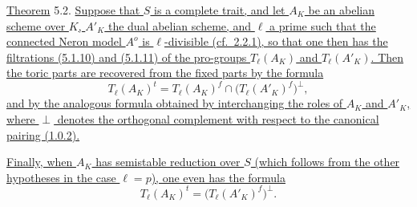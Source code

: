 %

\medskip
\noindent
\underline{Theorem} 5.2. \underline{Suppose that $S$ is a complete
trait, and let $A_K$ be an abelian scheme over $K$, $A'_K$ the dual
abelian scheme, and $\ell$ a prime such that the connected Neron model
$A^o$ is $\ell$-divisible (cf.\ 2.2.1), so that one then has the
filtrations (5.1.10) and (5.1.11) of the pro-groups
$T_\ell(A_K)$ and $T_\ell(A'_K)$.  Then the toric parts are
recovered from the fixed parts by the formula}
\begin{equation}\tag{5.2.1}
 T_\ell(A_K)^t
 =
 T_\ell(A_K)^f\cap\bigl(T_\ell(A'_K)^f\bigr)^\perp,
\end{equation}
\underline{and by the analogous formula obtained by interchanging the
roles of $A_K$ and $A'_K$, where $\perp$ denotes the orthogonal
complement with respect to the canonical pairing (1.0.2).}

\underline{Finally, when $A_K$ has semistable reduction over $S$
(which follows from the other hypotheses in the case $\ell=p$), one
even has the formula}
\begin{equation}\tag{5.2.2}
 T_\ell(A_K)^t=\bigl(T_\ell(A'_K)^f\bigr)^\perp.
\end{equation}


